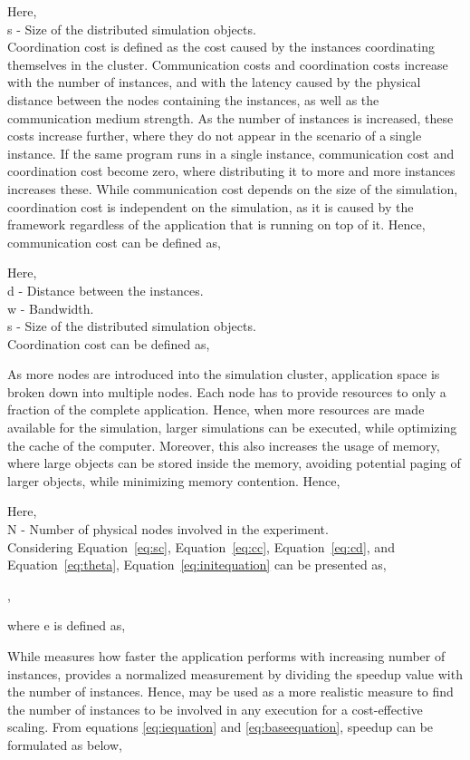 Here,\\
s - Size of the distributed simulation objects.\\

Coordination cost is defined as the cost caused by the instances coordinating themselves in the cluster. Communication costs and coordination costs increase with the number of instances, and with the latency caused by the physical distance between the nodes containing the instances, as well as the communication medium strength. As the number of instances is increased, these costs increase further, where they do not appear in the scenario of a single instance. If the same program runs in a single instance, communication cost and coordination cost become zero, where distributing it to more and more instances increases these. While communication cost depends on the size of the simulation, coordination cost is independent on the simulation, as it is caused by the framework regardless of the application that is running on top of it. Hence, communication cost can be defined as,

Here,\\
d - Distance between the instances.\\
w - Bandwidth.\\
s - Size of the distributed simulation objects.\\

Coordination cost can be defined as,


As more nodes are introduced into the simulation cluster, application space is broken down into multiple nodes. Each node has to provide resources to only a fraction of the complete application. Hence, when more resources are made available for the simulation, larger simulations can be executed, while optimizing the cache of the computer. Moreover, this also increases the usage of memory, where large objects can be stored inside the memory, avoiding potential paging of larger objects, while minimizing memory contention. Hence, 

Here,\\
N - Number of physical nodes involved in the experiment.\\


Considering Equation~\ref{eq:sc}, Equation~\ref{eq:cc}, Equation~\ref{eq:cd}, and Equation~\ref{eq:theta}, Equation~\ref{eq:initequation} can be presented as,

 
, 

where e is defined as,


While  measures how faster the application performs with increasing number of instances,  provides a normalized measurement by dividing the speedup value with the number of instances. Hence,  may be used as a more realistic measure to find the number of instances to be involved in any execution for a cost-effective scaling.
From equations \ref{eq:iequation} and \ref{eq:baseequation}, speedup can be formulated as below,


